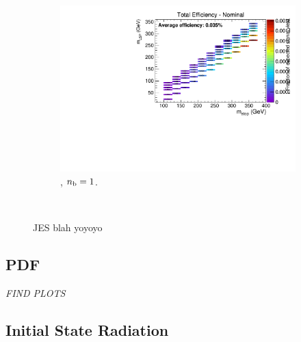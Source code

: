 \begin{figure}[ht!]
\begin{subfigure}[b]{0.32\textwidth}
    \includegraphics[width=\textwidth, page=6]{Figs/sms/t2cc/v24/JES_T2cc_v24_eq1b_ge4j_incl.pdf}
    \caption{\njhigh, $n_{\text{b}} = 1$.}
  \end{subfigure}\\
  \caption{JES blah yoyoyo}
  \label{fig:sms-jes-t2cc}
\end{figure}


\newpage
\subsection*{PDF}
\emph{FIND PLOTS}



\newpage
\subsection*{Initial State Radiation}

